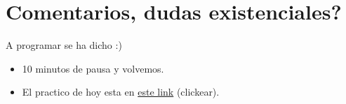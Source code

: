 \documentclass[
  10pt,
  ignorenonframetext,
]{beamer}
\providecommand{\tightlist}{%
  \setlength{\itemsep}{0pt}\setlength{\parskip}{0pt}}
\begin{document}
\hypertarget{comentarios-dudas-existenciales}{%
\section{Comentarios, dudas
existenciales?}\label{comentarios-dudas-existenciales}}

\begin{frame}{A programar se ha dicho :)}
\protect\hypertarget{a-programar-se-ha-dicho}{}
\begin{itemize}
\tightlist
\item
  10 minutos de pausa y volvemos. \vspace{20pt}
\item
  El practico de hoy esta en
  \href{https://rpubs.com/mlangleib/797813}{este link} (clickear).
\end{itemize}
\end{frame}
\end{document}
